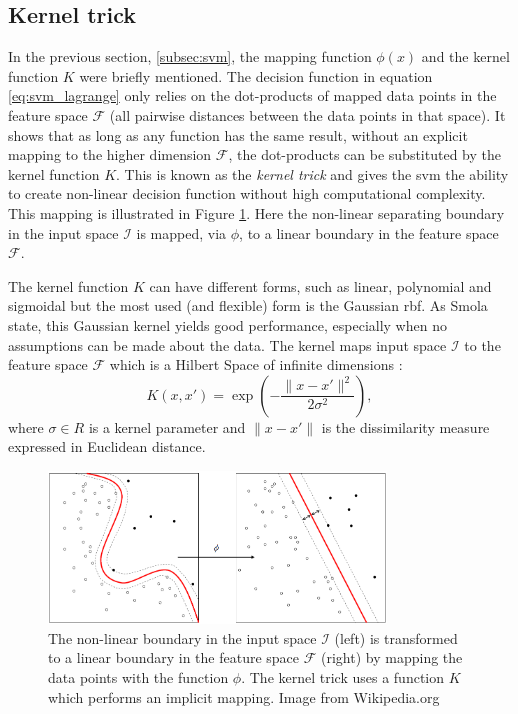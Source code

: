 
\subsection{Kernel trick}\label{subsec:kernel_trick}
In the previous section, \ref{subsec:svm}, the mapping function $\phi(x)$ and the kernel function $K$ were briefly mentioned.
The decision function in equation \ref{eq:svm_lagrange} only relies on the dot-products of mapped data points in the feature space $\mathcal{F}$ (\ie all pairwise distances between the data points in that space).
It shows \cite{flach2012machine} that as long as any function has the same result, without an explicit mapping to the higher dimension $\mathcal{F}$, the dot-products can be substituted by the kernel function $K$.
This is known as the \emph{kernel trick} and gives the \gls{svm} the ability to create non-linear decision function without high computational complexity.
This mapping is illustrated in Figure \ref{fig:kernel_mapping}.
Here the non-linear separating boundary in the input space $\mathcal{I}$ is mapped, via $\phi$, to a linear boundary in the feature space $\mathcal{F}$.

The kernel function $K$ can have different forms, such as linear, polynomial and sigmoidal but the most used (and flexible) form is the Gaussian \gls{rbf}.
As Smola \etal \cite{smola1998connection} state, this Gaussian kernel yields good performance, especially when no assumptions can be made about the data.
The kernel maps input space $\mathcal{I}$ to the feature space $\mathcal{F}$ which is a Hilbert Space of infinite dimensions :
\begin{equation}
  K(x, x') = \operatorname{exp} \left( - \frac{ \lVert x - x' \rVert ^2}{2 \sigma^2 } \right),
\end{equation}
where $\sigma \in R$ is a kernel parameter and $\lVert x - x' \rVert$ is the dissimilarity measure expressed in Euclidean distance.


\begin{figure}
\centering
  \includegraphics[width=0.8\textwidth]{./Figures/chapter3/svm_kernel_mapping.png}
  \caption[Kernel mapping]{The non-linear boundary in the input space $\mathcal{I}$ (left) is transformed to a linear boundary in the feature space $\mathcal{F}$ (right) by mapping the data points with the function $\phi$. The kernel trick uses a function $K$ which performs an implicit mapping. Image from Wikipedia.org\footnotemark}
  \label{fig:kernel_mapping}
\end{figure}


